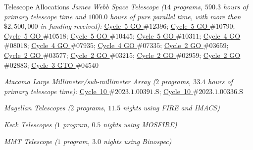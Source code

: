 \documentclass{JMH_CV}
\begin{document}
\begin{rSection}{Telescope Allocations}
\textit{James Webb Space Telescope (\boldmath$\mathit{14}$ programs, \boldmath$\mathit{590.3}$ hours of primary telescope time and \boldmath$\mathit{1000.0}$ hours of pure parallel time, with more than \boldmath$\mathbf{\textit{\$}} \mathit{2{,}500{,}000}$ in funding received):}
\href{https://www.stsci.edu/jwst/science-execution/program-information?id=12396}{\ul{Cycle~5 GO $\# 12396$}};
\href{https://www.stsci.edu/jwst/science-execution/program-information?id=10790}{\ul{Cycle~5 GO $\# 10790$}};
\href{https://www.stsci.edu/jwst/science-execution/program-information?id=10518}{\ul{Cycle~5 GO $\# 10518$}};
\href{https://www.stsci.edu/jwst/science-execution/program-information?id=10445}{\ul{Cycle~5 GO $\# 10445$}};
\href{https://www.stsci.edu/jwst/science-execution/program-information?id=10311}{\ul{Cycle~5 GO $\# 10311$}};
\href{https://www.stsci.edu/jwst/science-execution/program-information?id=8018}{\ul{Cycle~4 GO $\# 08018$}};
\href{https://www.stsci.edu/jwst/science-execution/program-information?id=7935}{\ul{Cycle~4 GO $\# 07935$}};
\href{https://www.stsci.edu/jwst/science-execution/program-information?id=7335}{\ul{Cycle~4 GO $\# 07335$}};
\href{https://www.stsci.edu/jwst/science-execution/program-information?id=3659}{\ul{Cycle~2 GO $\# 03659$}};
\href{https://www.stsci.edu/jwst/science-execution/program-information?id=3577}{\ul{Cycle~2 GO $\# 03577$}};
\href{https://www.stsci.edu/jwst/science-execution/program-information?id=3215}{\ul{Cycle~2 GO $\# 03215$}};
\href{https://www.stsci.edu/jwst/science-execution/program-information?id=2959}{\ul{Cycle~2 GO $\# 02959$}};
\href{https://www.stsci.edu/jwst/science-execution/program-information?id=2883}{\ul{Cycle~2 GO $\# 02883$}};
\href{https://www.stsci.edu/jwst/science-execution/program-information?id=4540}{\ul{Cycle~3 GTO $\# 04540$}}

\textit{Atacama Large Millimeter/sub-millimeter Array (\boldmath$\mathit{2}$ programs, \boldmath$\mathit{33.4}$ hours of primary telescope time):}
\href{https://almascience.nrao.edu/aq/?result_view=projects&projectCode=2023.1.00391.S}{\ul{Cycle~10 $\# 2023.1.00391.\mathrm{S}$}}; \href{https://almascience.nrao.edu/aq/?result_view=projects&projectCode=2023.1.00336.S}{\ul{Cycle~10 $\# 2023.1.00336.\mathrm{S}$}}

\textit{Magellan Telescopes (\boldmath$\mathit{2}$ programs, \boldmath$\mathit{11.5}$ nights using FIRE and IMACS)}

\textit{Keck Telescopes (\boldmath$\mathit{1}$ program, \boldmath$\mathit{0.5}$ nights using MOSFIRE)}

\textit{MMT Telescope (\boldmath$\mathit{1}$ program, \boldmath$\mathit{3.0}$ nights using Binospec)}

\end{rSection}
\end{document}
